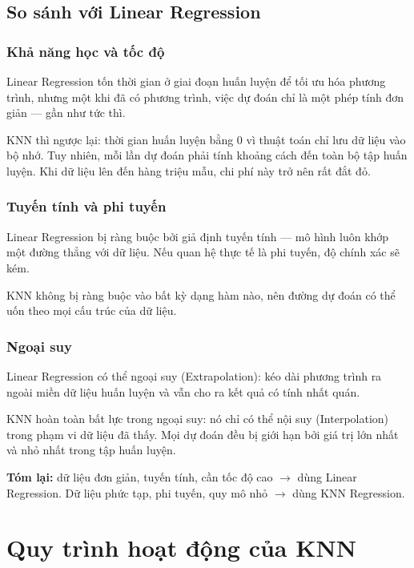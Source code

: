 \documentclass[12pt,a4paper]{article}
\begin{document}
\subsection{So sánh với Linear Regression}

\subsubsection{Khả năng học và tốc độ}

Linear Regression tốn thời gian ở giai đoạn huấn luyện để tối ưu hóa phương trình, nhưng một khi đã có phương trình, việc dự đoán chỉ là một phép tính đơn giản — gần như tức thì.

KNN thì ngược lại: thời gian huấn luyện bằng 0 vì thuật toán chỉ lưu dữ liệu vào bộ nhớ. Tuy nhiên, mỗi lần dự đoán phải tính khoảng cách đến toàn bộ tập huấn luyện. Khi dữ liệu lên đến hàng triệu mẫu, chi phí này trở nên rất đắt đỏ.

\subsubsection{Tuyến tính và phi tuyến}

Linear Regression bị ràng buộc bởi giả định tuyến tính — mô hình luôn khớp một đường thẳng với dữ liệu. Nếu quan hệ thực tế là phi tuyến, độ chính xác sẽ kém.

KNN không bị ràng buộc vào bất kỳ dạng hàm nào, nên đường dự đoán có thể uốn theo mọi cấu trúc của dữ liệu.

\subsubsection{Ngoại suy}

Linear Regression có thể ngoại suy (Extrapolation): kéo dài phương trình ra ngoài miền dữ liệu huấn luyện và vẫn cho ra kết quả có tính nhất quán.

KNN hoàn toàn bất lực trong ngoại suy: nó chỉ có thể nội suy (Interpolation) trong phạm vi dữ liệu đã thấy. Mọi dự đoán đều bị giới hạn bởi giá trị lớn nhất và nhỏ nhất trong tập huấn luyện.

\medskip
\noindent\textbf{Tóm lại:} dữ liệu đơn giản, tuyến tính, cần tốc độ cao $\to$ dùng Linear Regression. Dữ liệu phức tạp, phi tuyến, quy mô nhỏ $\to$ dùng KNN Regression.

\section{Quy trình hoạt động của KNN}
\end{document}
